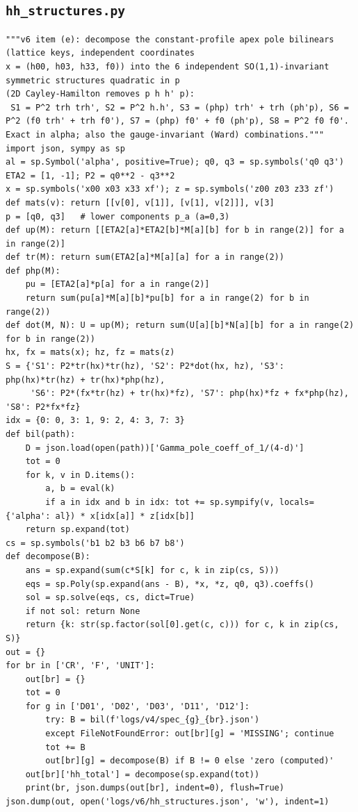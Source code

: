 \documentclass[10pt]{article}
\begin{document}
\subsection{\texttt{hh\_structures.py}}
\begin{lstlisting}
"""v6 item (e): decompose the constant-profile apex pole bilinears (lattice keys, independent coordinates
x = (h00, h03, h33, f0)) into the 6 independent SO(1,1)-invariant symmetric structures quadratic in p
(2D Cayley-Hamilton removes p h h' p):
 S1 = P^2 trh trh', S2 = P^2 h.h', S3 = (php) trh' + trh (ph'p), S6 = P^2 (f0 trh' + trh f0'), S7 = (php) f0' + f0 (ph'p), S8 = P^2 f0 f0'.
Exact in alpha; also the gauge-invariant (Ward) combinations."""
import json, sympy as sp
al = sp.Symbol('alpha', positive=True); q0, q3 = sp.symbols('q0 q3')
ETA2 = [1, -1]; P2 = q0**2 - q3**2
x = sp.symbols('x00 x03 x33 xf'); z = sp.symbols('z00 z03 z33 zf')
def mats(v): return [[v[0], v[1]], [v[1], v[2]]], v[3]
p = [q0, q3]   # lower components p_a (a=0,3)
def up(M): return [[ETA2[a]*ETA2[b]*M[a][b] for b in range(2)] for a in range(2)]
def tr(M): return sum(ETA2[a]*M[a][a] for a in range(2))
def php(M):
    pu = [ETA2[a]*p[a] for a in range(2)]
    return sum(pu[a]*M[a][b]*pu[b] for a in range(2) for b in range(2))
def dot(M, N): U = up(M); return sum(U[a][b]*N[a][b] for a in range(2) for b in range(2))
hx, fx = mats(x); hz, fz = mats(z)
S = {'S1': P2*tr(hx)*tr(hz), 'S2': P2*dot(hx, hz), 'S3': php(hx)*tr(hz) + tr(hx)*php(hz),
     'S6': P2*(fx*tr(hz) + tr(hx)*fz), 'S7': php(hx)*fz + fx*php(hz), 'S8': P2*fx*fz}
idx = {0: 0, 3: 1, 9: 2, 4: 3, 7: 3}
def bil(path):
    D = json.load(open(path))['Gamma_pole_coeff_of_1/(4-d)']
    tot = 0
    for k, v in D.items():
        a, b = eval(k)
        if a in idx and b in idx: tot += sp.sympify(v, locals={'alpha': al}) * x[idx[a]] * z[idx[b]]
    return sp.expand(tot)
cs = sp.symbols('b1 b2 b3 b6 b7 b8')
def decompose(B):
    ans = sp.expand(sum(c*S[k] for c, k in zip(cs, S)))
    eqs = sp.Poly(sp.expand(ans - B), *x, *z, q0, q3).coeffs()
    sol = sp.solve(eqs, cs, dict=True)
    if not sol: return None
    return {k: str(sp.factor(sol[0].get(c, c))) for c, k in zip(cs, S)}
out = {}
for br in ['CR', 'F', 'UNIT']:
    out[br] = {}
    tot = 0
    for g in ['D01', 'D02', 'D03', 'D11', 'D12']:
        try: B = bil(f'logs/v4/spec_{g}_{br}.json')
        except FileNotFoundError: out[br][g] = 'MISSING'; continue
        tot += B
        out[br][g] = decompose(B) if B != 0 else 'zero (computed)'
    out[br]['hh_total'] = decompose(sp.expand(tot))
    print(br, json.dumps(out[br], indent=0), flush=True)
json.dump(out, open('logs/v6/hh_structures.json', 'w'), indent=1)
\end{lstlisting}
\end{document}
